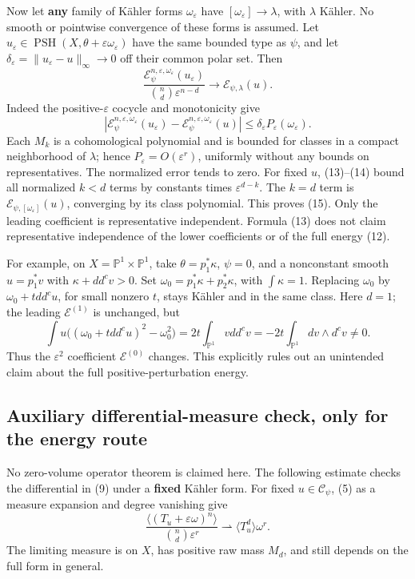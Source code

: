 \documentclass[
  11pt,
]{article}
\begin{document}
Now let \textbf{any} family of Kähler forms \(\omega_\varepsilon\) have
\([\omega_\varepsilon]\to\lambda\), with \(\lambda\) Kähler. No smooth
or pointwise convergence of these forms is assumed. Let
\(u_\varepsilon\in\operatorname{PSH}(X,\theta+\varepsilon\omega_\varepsilon)\)
have the same bounded type as \(\psi\), and let
\(\delta_\varepsilon=\|u_\varepsilon-u\|_\infty\to0\) off their common
polar set. Then \[
\frac{\mathcal{E}^{n,\varepsilon,\omega_\varepsilon}_\psi(u_\varepsilon)}
{\binom n d\varepsilon^{n-d}}
\longrightarrow\mathcal{E}_{\psi,\lambda}(u).
\tag{15}
\] Indeed the positive-\(\varepsilon\) cocycle and monotonicity give \[
|\mathcal{E}^{n,\varepsilon,\omega_\varepsilon}_\psi(u_\varepsilon)
-\mathcal{E}^{n,\varepsilon,\omega_\varepsilon}_\psi(u)|
\leq\delta_\varepsilon P_\varepsilon(\omega_\varepsilon).
\] Each \(M_k\) is a cohomological polynomial and is bounded for classes
in a compact neighborhood of \(\lambda\); hence
\(P_\varepsilon=O(\varepsilon^r)\), uniformly without any bounds on
representatives. The normalized error tends to zero. For fixed \(u\),
(13)--(14) bound all normalized \(k<d\) terms by constants times
\(\varepsilon^{d-k}\). The \(k=d\) term is
\(\mathcal{E}_{\psi,[\omega_\varepsilon]}(u)\), converging by its class
polynomial. This proves (15). Only the leading coefficient is
representative independent. Formula (13) does not claim representative
independence of the lower coefficients or of the full energy (12).

For example, on \(X=\mathbb{P}^1\times\mathbb{P}^1\), take
\(\theta=p_1^*\kappa\), \(\psi=0\), and a nonconstant smooth
\(u=p_1^*v\) with \(\kappa+dd^cv>0\). Set
\(\omega_0=p_1^*\kappa+p_2^*\kappa\), with \(\int\kappa=1\). Replacing
\(\omega_0\) by \(\omega_0+tdd^cu\), for small nonzero \(t\), stays
Kähler and in the same class. Here \(d=1\); the leading
\(\mathcal{E}^{(1)}\) is unchanged, but \[
\int u\big((\omega_0+tdd^cu)^2-\omega_0^2\big)
=2t\int_{\mathbb{P}^1}vdd^cv
=-2t\int_{\mathbb{P}^1}dv\wedge d^cv\ne0.
\] Thus the \(\varepsilon^2\) coefficient \(\mathcal{E}^{(0)}\) changes.
This explicitly rules out an unintended claim about the full
positive-perturbation energy.

\subsection{Auxiliary differential-measure check, only for the energy
route}\label{auxiliary-differential-measure-check-only-for-the-energy-route}

No zero-volume operator theorem is claimed here. The following estimate
checks the differential in (9) under a \textbf{fixed} Kähler form. For
fixed \(u\in\mathcal{C}_\psi\), (5) as a measure expansion and degree
vanishing give \[
\frac{\langle(T_u+\varepsilon\omega)^n\rangle}
{\binom n d\varepsilon^r}
\rightharpoonup\langle T_u^d\rangle\omega^r.
\tag{16}
\] The limiting measure is on \(X\), has positive raw mass \(M_d\), and
still depends on the full form in general.
\end{document}
